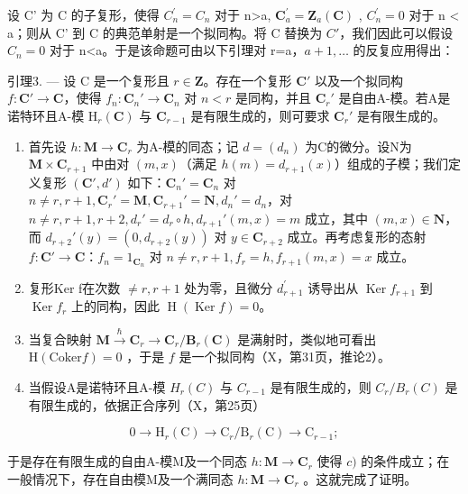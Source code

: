 设 C' 为 C 的子复形，使得 \(C_{n}^{\prime}=C_{n}\) 对于 n\textgreater a, \(\mathbf{C}_{a}^{\prime}=\mathbf{Z}_{a}(\mathbf{C})\) , \(C_{n}^{\prime}=0\) 对于 n \textless{} a；则从 C' 到 C 的典范单射是一个拟同构。将 C 替换为 \(C'\)，我们因此可以假设 \(C_{n}=0\) 对于 n\textless a。于是该命题可由以下引理对 r=a，\(a+1,\ldots\) 的反复应用得出：

引理3. --- 设 C 是一个复形且 \(r \in \mathbf{Z}\)。存在一个复形 \(\mathbf{C}'\) 以及一个拟同构 \(f: \mathbf{C}' \to \mathbf{C}\)，使得 \(f_n: \mathbf{C}_n' \to \mathbf{C}_n\) 对 \(n < r\) 是同构，并且 \(\mathbf{C}_r'\) 是自由A-模。若A是诺特环且A-模 \(\mathrm{H}_r(\mathbf{C})\) 与 \(\mathbf{C}_{r-1}\) 是有限生成的，则可要求 \(\mathbf{C}_r'\) 是有限生成的。

\begin{enumerate}
\def\labelenumi{\alph{enumi})}
\item
  首先设 \(h: \mathbf{M} \to \mathbf{C}_r\) 为A-模的同态；记 \(d = (d_n)\) 为C的微分。设N为 \(\mathbf{M} \times \mathbf{C}_{r+1}\) 中由对 \((m, x)\)（满足 \(h(m) = d_{r+1}(x)\)）组成的子模；我们定义复形 \((\mathbf{C}', d')\) 如下：\(\mathbf{C}_n' = \mathbf{C}_n\) 对 \(n \neq r, r+1, \mathbf{C}_r' = \mathbf{M}, \mathbf{C}_{r+1}' = \mathbf{N}, d_n' = d_n\)，对 \(n \neq r, r+1, r+2, d_r' = d_r \circ h, d_{r+1}'(m, x) = m\) 成立，其中 \((m, x) \in \mathbf{N}\)，而 \(d_{r+2}'(y) = (0, d_{r+2}(y))\) 对 \(y \in \mathbf{C}_{r+2}\) 成立。再考虑复形的态射 \(f: \mathbf{C}' \to \mathbf{C}\)：\(f_n = 1_{\mathbf{C}_n}\) 对 \(n \neq r, r+1, f_r = h, f_{r+1}(m, x) = x\) 成立。
\item
  复形Ker f在次数 \(\neq r, r + 1\) 处为零，且微分 \(d_{r+1}^{\prime}\) 诱导出从 \(\operatorname{Ker} f_{r+1}\) 到 \(\operatorname{Ker} f_r\) 上的同构，因此 \(\operatorname{H}(\operatorname{Ker} f) = 0\)。
\item
  当复合映射 \(\mathbf{M} \xrightarrow{\hbar} \mathbf{C}_r \to \mathbf{C}_r / \mathbf{B}_r(\mathbf{C})\) 是满射时，类似地可看出 \(\mathrm{H}(\mathrm{Coker}f) = 0\) ，于是 \(f\) 是一个拟同构（X，第31页，推论2）。
\item
  当假设A是诺特环且A-模 \(H_{r}(C)\) 与 \(C_{r-1}\) 是有限生成的，则 \(C_{r}/B_{r}(C)\) 是有限生成的，依据正合序列（X，第25页）
\end{enumerate}

\[
0 \to \mathrm{H} _ {r} (\mathrm{C}) \to \mathrm{C} _ {r} / \mathrm{B} _ {r} (\mathrm{C}) \to \mathrm{C} _ {r - 1};
\]

于是存在有限生成的自由A-模M及一个同态 \(h: \mathbf{M} \to \mathbf{C}_{r}\) 使得 \(c)\) 的条件成立；在一般情况下，存在自由模M及一个满同态 \(h: \mathbf{M} \to \mathbf{C}_{r}\) 。这就完成了证明。

